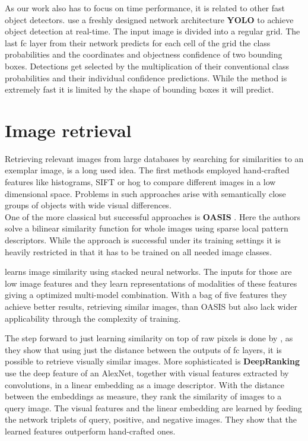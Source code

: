 As our work also has to focus on time performance, it is related to other fast object detectors. \citet{redmon_you_2016} use a freshly designed network architecture \textbf{YOLO} to achieve object detection at real-time. The input image is divided into a regular grid. The last \gls{fc} layer from their network predicts for each cell of the grid the class probabilities and the coordinates and objectness confidence of two bounding boxes. Detections get selected by the multiplication of their conventional class probabilities and their individual confidence predictions. While the method is extremely fast it is limited by the shape of bounding boxes it will predict.
\clearpage
\section{Image retrieval}
\label{sec:related:retrieval}
Retrieving relevant images from large databases by searching for similarities to an exemplar image, is a long used idea. The first methods employed hand-crafted features like histograms, SIFT or \gls{hog} to compare different images in a low dimensional space. Problems in such approaches arise with semantically close groups of objects with wide visual differences.\\
One of the more classical but successful approaches is \textbf{OASIS} \citep{chechik_large_2010}. Here the authors solve a bilinear similarity function for whole images using sparse local pattern descriptors. While the approach is successful under its training settings it is heavily restricted in that it has to be trained on all needed image classes.

\citet{wu_online_2013} learns image similarity using stacked neural networks. The inputs for those are low image features and they learn representations of modalities of these features giving a optimized multi-model combination. With a bag of five features they achieve better results, retrieving similar images, than OASIS but also lack wider applicability through the complexity of training.

The step forward to just learning similarity on top of raw pixels is done by \citet{babenko_neural_2014}, as they show that using just the distance between  the outputs of \gls{fc} layers, it is possible to retrieve visually similar images. More sophisticated is \textbf{DeepRanking} \citep{wang_learning_2014} use the deep feature of an AlexNet, together with visual features extracted by convolutions, in a linear embedding as a image descriptor. With the distance between the embeddings as measure, they rank the similarity of images to a query image. The visual features and the linear embedding are learned by feeding the network triplets of query, positive, and negative images. They show that the learned features outperform hand-crafted ones.

